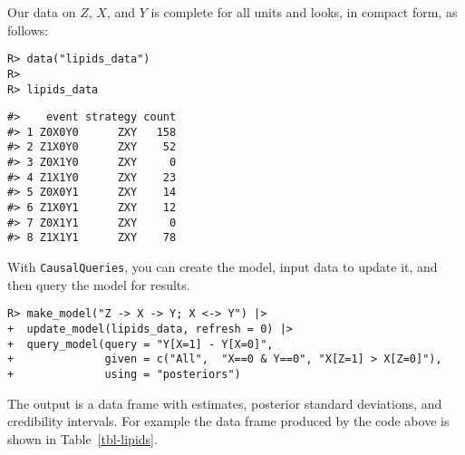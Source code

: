 \documentclass[
  11pt,
  article]{jss}
\begin{document}
Our data on \(Z\), \(X\), and \(Y\) is complete for all units and looks,
in compact form, as follows:

\begin{verbatim}
R> data("lipids_data")
R> 
R> lipids_data
\end{verbatim}

\begin{verbatim}
#>    event strategy count
#> 1 Z0X0Y0      ZXY   158
#> 2 Z1X0Y0      ZXY    52
#> 3 Z0X1Y0      ZXY     0
#> 4 Z1X1Y0      ZXY    23
#> 5 Z0X0Y1      ZXY    14
#> 6 Z1X0Y1      ZXY    12
#> 7 Z0X1Y1      ZXY     0
#> 8 Z1X1Y1      ZXY    78
\end{verbatim}

With \texttt{CausalQueries}, you can create the model, input data to
update it, and then query the model for results.

\begin{verbatim}
R> make_model("Z -> X -> Y; X <-> Y") |>
+  update_model(lipids_data, refresh = 0) |>
+  query_model(query = "Y[X=1] - Y[X=0]",
+              given = c("All",  "X==0 & Y==0", "X[Z=1] > X[Z=0]"),
+              using = "posteriors") 
\end{verbatim}

\hypertarget{tbl-lipids}{}
\begin{table}
\caption{\label{tbl-lipids}Replication of \citet{chickering1996clinician}. }\tabularnewline

\centering
{}
\end{table}

The output is a data frame with estimates, posterior standard
deviations, and credibility intervals. For example the data frame
produced by the code above is shown in Table~\ref{tbl-lipids}.
\end{document}
